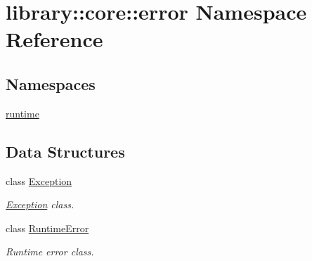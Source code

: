 \hypertarget{namespacelibrary_1_1core_1_1error}{}\section{library\+:\+:core\+:\+:error Namespace Reference}
\label{namespacelibrary_1_1core_1_1error}
\subsection*{Namespaces}
\begin{DoxyCompactItemize}
\item 
 \hyperlink{namespacelibrary_1_1core_1_1error_1_1runtime}{runtime}
\end{DoxyCompactItemize}
\subsection*{Data Structures}
\begin{DoxyCompactItemize}
\item 
class \hyperlink{classlibrary_1_1core_1_1error_1_1Exception}{Exception}
\begin{DoxyCompactList}\small\item\em \hyperlink{classlibrary_1_1core_1_1error_1_1Exception}{Exception} class. \end{DoxyCompactList}\item 
class \hyperlink{classlibrary_1_1core_1_1error_1_1RuntimeError}{Runtime\+Error}
\begin{DoxyCompactList}\small\item\em Runtime error class. \end{DoxyCompactList}\end{DoxyCompactItemize}
